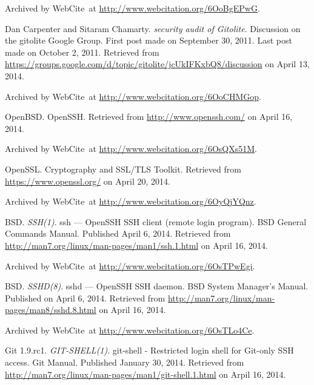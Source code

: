 \begin{thebibliography}{9}
Archived by WebCite\textsuperscript{\textregistered}\ at
\url{http://www.webcitation.org/6OoBgEPwG}.


Dan Carpenter and Sitaram Chamarty. \emph{security audit of Gitolite}.
Discussion on the gitolite Google Group.  First post made on September 30,
2011. Last post made on October 2, 2011. Retrieved from
\url{https://groups.google.com/d/topic/gitolite/jcUkIFKxbQ8/discussion} on
April 13, 2014.

Archived by WebCite\textsuperscript{\textregistered}\ at
\url{http://www.webcitation.org/6OoCHMGop}.


OpenBSD. OpenSSH. Retrieved from \url{http://www.openssh.com/} on April 16,
2014.

Archived by WebCite\textsuperscript{\textregistered}\ at
\url{http://www.webcitation.org/6OsQXs51M}.


OpenSSL. Cryptography and SSL/TLS Toolkit. Retrieved from
\url{https://www.openssl.org/} on April 20, 2014.

Archived by WebCite\textsuperscript{\textregistered}\ at
\url{http://www.webcitation.org/6OyQjYQnz}.



BSD. \emph{SSH(1)}. ssh — OpenSSH SSH client (remote login program). BSD
General Commands Manual. Published April 6, 2014.  Retrieved from
\url{http://man7.org/linux/man-pages/man1/ssh.1.html} on April 16, 2014.

Archived by WebCite\textsuperscript{\textregistered}\ at
\url{http://www.webcitation.org/6OsTPwEgi}.


BSD. \emph{SSHD(8)}. sshd --- OpenSSH SSH daemon. BSD System Manager's Manual.
Published on April 6, 2014. Retrieved from
\url{http://man7.org/linux/man-pages/man8/sshd.8.html} on April 16, 2014.

Archived by WebCite\textsuperscript{\textregistered}\ at
\url{http://www.webcitation.org/6OsTLo4Ce}.


Git 1.9.rc1. \emph{GIT-SHELL(1)}. git-shell - Restricted login shell for
Git-only SSH access. Git Manual. Published January 30, 2014. Retrieved from
\url{http://man7.org/linux/man-pages/man1/git-shell.1.html} on Arpil 16, 2014.


\end{thebibliography}
